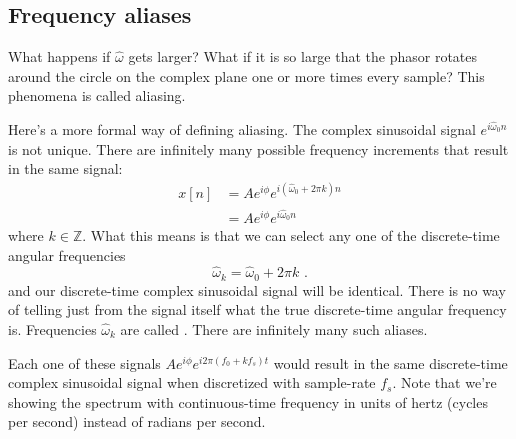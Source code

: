 \subsection{Frequency aliases}
What happens if $\hat{\omega}$ gets larger? What if it is so large that the phasor rotates around the circle on the complex plane one or more times every sample? This phenomena is called aliasing.

Here's a more formal way of defining aliasing. The complex sinusoidal
signal $e^{i\hat{\omega}_0 n}$ is not unique. There are infinitely
many possible frequency increments that result in the same signal:
\begin{align}
x[n]    &=Ae^{i\phi} e^{i(\hat{\omega}_0 + 2\pi k) n}\\
&=Ae^{i\phi} e^{i \hat{\omega}_0  n}
\end{align}
where $k\in\mathbb{Z}$. What this means is that we can select any one
of the discrete-time angular frequencies
\begin{equation}
  \boxed{
    \hat{\omega}_k = \hat{\omega}_0 + 2\pi k
    }\,\,.
\end{equation}
and our discrete-time complex sinusoidal signal will be
identical. There is no way of telling just from the signal itself what
the true discrete-time angular frequency is. Frequencies
$\hat{\omega}_k$ are called \emph{}. There are
infinitely many such aliases.

\begin{marginfigure}[5cm]
\begin{center}
\end{center}
\caption{Each one of these signals $Ae^{i\phi}e^{i2\pi (f_0 + k f_s)t}$
  would result in the same discrete-time complex sinusoidal signal
  when discretized with sample-rate $f_s$. Note that we're showing the
  spectrum with continuous-time frequency in units of hertz (cycles
  per second) instead of radians per second.}
\end{marginfigure}

